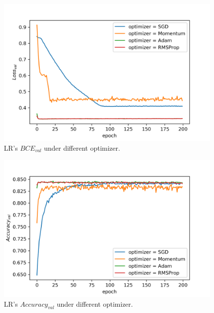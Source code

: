 \documentclass[journal, a4paper]{IEEEtran}
\begin{document}
\begin{figure}[!hbt]
	\begin{center}
		\includegraphics[width=\columnwidth]{lr_optim_val_loss}
		\caption{LR's $BCE_{val}$ under different optimizer.}
		\label{fig:lr_optim_val_loss}
	\end{center}
\end{figure} \par

\begin{figure}[!hbt]
	\begin{center}
		\includegraphics[width=\columnwidth]{lr_optim_val_acc}
		\caption{LR's $Accuracy_{val}$ under different optimizer.}
		\label{fig:lr_optim_val_acc}
	\end{center}
\end{figure} \par
\end{document}
